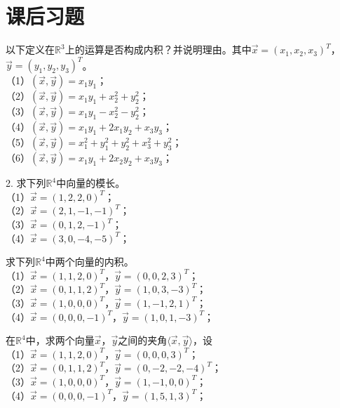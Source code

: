 
\section{课后习题}

\begin{ex}\label{6.1}
以下定义在$\mathbb{R}^3$上的运算是否构成内积？并说明理由。其中$\vec{x}=(x_1,x_2,x_3 )^T$，
 $\vec{y}=(y_1,y_2,y_3 )^T$。\\
（1）$(\vec{x},\vec{y})=x_1y_1$；\\
（2）$(\vec{x},\vec{y})=x_1y_1+x_2^2+y_2^2$；\\
（3）$(\vec{x},\vec{y})=x_1y_1-x_2^2-y_2^2$；\\
（4）$(\vec{x},\vec{y})=x_1y_1+2x_1y_2+x_3y_3$；\\
（5）$(\vec{x},\vec{y})=x_1^2+y_1^2+y_2^2+x_3^2+y_3^2$；\\
（6）$(\vec{x},\vec{y})=x_1y_1+2x_2y_2+x_3y_3$；
\end{ex}

\begin{ex}\label{6.2}
2. 求下列$\mathbb{R}^4$中向量的模长。\\
（1）$\vec{x}=(1,2,2,0)^T$；\\
（2）$\vec{x}=(2,1,-1,-1)^T$；\\
（3）$\vec{x}=(0,1,2,-1)^T$；\\
（4）$\vec{x}=(3,0,-4,-5)^T$；
\end{ex}

\begin{ex}\label{6.3}
求下列$\mathbb{R}^4$中两个向量的内积。\\
（1）$\vec{x}=(1,1,2,0)^T$，$\vec{y}=(0,0,2,3)^T$；\\
（2）$\vec{x}=(0,1,1,2)^T$，$\vec{y}=(1,0,3,-3)^T$；\\
（3）$\vec{x}=(1,0,0,0)^T$，$\vec{y}=(1,-1,2,1)^T$；\\
（4）$\vec{x}=(0,0,0,-1)^T$，$\vec{y}=(1,0,1,-3)^T$；
\end{ex}

\begin{ex}\label{6.4}
在$\mathbb{R}^4$中，求两个向量$\vec{x}$，$\vec{y}$之间的夹角$\langle\vec{x},\vec{y}\rangle$，设\\
（1）$\vec{x}=(1,1,2,0)^T$，$\vec{y}=(0,0,0,3)^T$；\\
（2）$\vec{x}=(0,1,1,2)^T$，$\vec{y}=(0,-2,-2,-4)^T$；\\
（3）$\vec{x}=(1,0,0,0)^T$，$\vec{y}=(1,-1,0,0)^T$；\\
（4）$\vec{x}=(0,0,0,-1)^T$，$\vec{y}=(1,5,1,3)^T$；
\end{ex}

